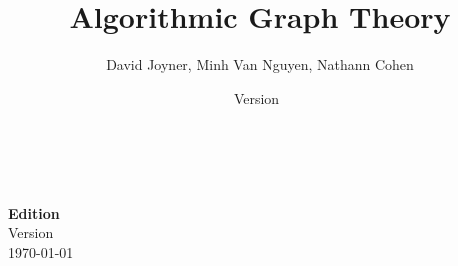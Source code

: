 \documentclass[a4paper,twoside,12pt]{book}
\newcommand{\documentEdition}{}
\begin{document}
\title{\Huge{\bf{Algorithmic Graph Theory}}}
\author{\Large{David Joyner, Minh Van Nguyen, Nathann Cohen}}
\date{Version~\documentEdition}
\maketitle

{\thispagestyle{empty}
   \\\\
  \textbf{Edition} \\
  Version~\documentEdition \\
  \today
}

\frontmatter
\setcounter{tocdepth}{1}
\tableofcontents

\listofalgorithms
{}
\listoffigures
{}
\listoftables
{}

\mainmatter












\appendix


\backmatter


\printindex
\end{document}
